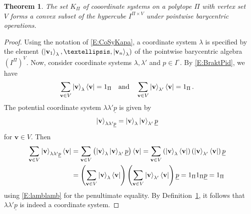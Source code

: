 \documentclass[10pt,a4paper]{amsart}
\newtheorem{theorem}{Theorem}
\begin{document}
\begin{theorem}\label{T:PolCoSys}
The set $K_\Pi$ of cooordinate systems on a polytope $\Pi$ with vertex set $V$ forms a convex subset of the hypercube $I^{\Pi\times V}$ under pointwise barycentric operations.
\end{theorem}

\begin{proof}
Using the notation of \eqref{E:CoSyKapa}, a coordinate system $\lambda$ is specified by the element $(\ket{\mathbf v_1}_\lambda,\dots,\ket{\mathbf v_n}_\lambda)$ of the pointwise barycentric algebra $(I^\Pi)^V$. Now, consider coordinate systems $\lambda,\lambda'$ and $p\in I^\circ$. By \eqref{E:BraktPid}, we have
\begin{equation}\label{E:lamblamb}
\sum_{\mathbf v\in V}\ket{\mathbf v}_{\lambda}\bra{\mathbf v}=1_\Pi
\quad
\mbox{and}
\quad
\sum_{\mathbf v\in V}\ket{\mathbf v}_{\lambda'}\bra{\mathbf v}=1_\Pi\,.
\end{equation}
The potential coordinate system $\lambda\lambda'\underline p$ is given by
$$
\ket{\mathbf v}_{\lambda\lambda'\underline p}
=\ket{\mathbf v}_{\lambda}\ket{\mathbf v}_{\lambda'}\underline p
$$
for $\mathbf{v}\in V$. Then
\begin{align*}
\sum_{\mathbf v\in V}\ket{\mathbf v}_{\lambda\lambda'\underline p}\bra{\mathbf v}
&
=
\sum_{\mathbf v\in V}\left(\ket{\mathbf v}_{\lambda}\ket{\mathbf v}_{\lambda'}\underline p
\right)\bra{\mathbf v}
=
\sum_{\mathbf v\in V}
\left(\ket{\mathbf v}_{\lambda}\bra{\mathbf v}\right)
\left(\ket{\mathbf v}_{\lambda'}\bra{\mathbf v}\right)
\underline p
\\
&
=
\left(
\sum_{\mathbf{v}\in V}\ket{\mathbf v}_{\lambda}\bra{\mathbf v}
\right)
\left(
\sum_{\mathbf{v}\in V}\ket{\mathbf v}_{\lambda'}\bra{\mathbf v}
\right)
\underline p
=1_\Pi1_\Pi\underline p
=1_\Pi
\end{align*}
using \eqref{E:lamblamb} for the penultimate equality. By Definition~\ref{T:PolCoSys}, it follows that $\lambda\lambda'\underline p$ is indeed a coordinate system.
\end{proof}
\end{document}
